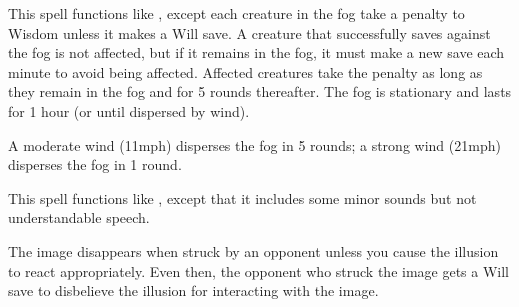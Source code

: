 \spellrng{\rngclose}
\begin{spelleffect}
  This spell functions like , except each creature in the fog take a  penalty to Wisdom unless it makes a Will save. A creature that successfully saves against the fog is not affected, but if it remains in the fog, it must make a new save each minute to avoid being affected. Affected creatures take the penalty as long as they remain in the fog and for 5 rounds thereafter. The fog is stationary and lasts for 1 hour (or until dispersed by wind).
\end{spelleffect}
\begin{spellnotes}
  A moderate wind (11\add mph) disperses the fog in 5 rounds; a strong wind (21\add mph) disperses the fog in 1 round.
\end{spellnotes}

\spellrng{\rngmed}
\spelldur{\durshort}
\begin{spelleffect}
  This spell functions like , except that it includes some minor sounds but not understandable speech.
\end{spelleffect}
\begin{spellnotes}
  The image disappears when struck by an opponent unless you cause the illusion to react appropriately. Even then, the opponent who struck the image gets a Will save to disbelieve the illusion for interacting with the image.
\end{spellnotes}

